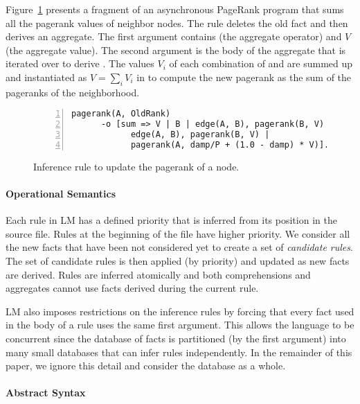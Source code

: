 Figure~\ref{code:pagerank} presents a fragment of an asynchronous PageRank
program that sums all the pagerank values of neighbor nodes. The rule deletes
the old  fact and then derives an aggregate. The first argument
contains  (the aggregate operator) and $V$ (the aggregate value). The
second argument  is the body of the aggregate
that is iterated over to derive . The values
$V_i$ of each combination of  and  are summed up and
instantiated as $V = \sum_i V_i$ in  to compute the new pagerank as the sum of the pageranks of the
neighborhood.

\begin{figure}[h]
\vspace{-3mm}
\begin{Verbatim}[numbers=left,fontsize=\stuffsize,xleftmargin=\stuffleftmargin]
pagerank(A, OldRank)
      -o [sum => V | B | edge(A, B), pagerank(B, V) |
            edge(A, B), pagerank(B, V) |
            pagerank(A, damp/P + (1.0 - damp) * V)].
\end{Verbatim}
   \caption{Inference rule to update the pagerank of a node.}
   \label{code:pagerank}
\vspace{-5mm}
\end{figure}

\paragraph{Operational Semantics} Each rule in LM has a defined priority that is
inferred from its position in the source file.  Rules at the beginning of the
file have higher priority. We consider all the new facts that have been not
considered yet to create a set of \emph{candidate rules}.  The set of candidate
rules is then applied (by priority) and updated as new facts are derived.  Rules
are inferred atomically and both comprehensions and aggregates cannot use facts
derived during the current rule.

LM also imposes restrictions on the inference rules by forcing that every fact
used in the body of a rule uses the same first argument. This allows the
language to be concurrent since the database of facts is partitioned (by the
first argument) into many small databases that can infer rules independently.
In the remainder of this paper, we ignore this detail and consider the database
as a whole.

\paragraph{Abstract Syntax} 

